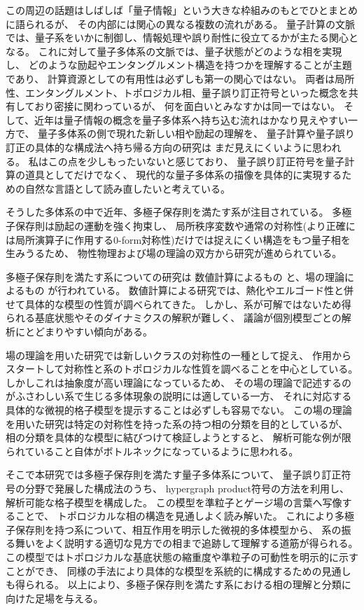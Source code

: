 \documentclass[../master.tex]{subfiles}
\begin{document}
この周辺の話題はしばしば「量子情報」という大きな枠組みのもとでひとまとめに語られるが、
その内部には関心の異なる複数の流れがある。
量子計算の文脈では、量子系をいかに制御し、情報処理や誤り耐性に役立てるかが主たる関心となる。
これに対して量子多体系の文脈では、量子状態がどのような相を実現し、
どのような励起やエンタングルメント構造を持つかを理解することが主題であり、
計算資源としての有用性は必ずしも第一の関心ではない。
両者は局所性、エンタングルメント、トポロジカル相、量子誤り訂正符号といった概念を共有しており密接に関わっているが、
何を面白いとみなすかは同一ではない。
そして、近年は量子情報の概念を量子多体系へ持ち込む流れはかなり見えやすい一方で、
量子多体系の側で現れた新しい相や励起の理解を、
量子計算や量子誤り訂正の具体的な構成法へ持ち帰る方向の研究は
まだ見えにくいように思われる。
私はこの点を少しもったいないと感じており、
量子誤り訂正符号を量子計算の道具としてだけでなく、
現代的な量子多体系の描像を具体的に実現するための自然な言語として読み直したいと考えている。

\bigskip
そうした多体系の中で近年、多極子保存則を満たす系が注目されている。
多極子保存則は励起の運動を強く拘束し、
局所秩序変数や通常の対称性(より正確には局所演算子に作用する0-form対称性)だけでは捉えにくい構造をもつ量子相を生みうるため、
物性物理および場の理論の双方から研究が進められている。

多極子保存則を満たす系についての研究は
数値計算によるもの
\cite{Sala2020-tm,Khemani2020-uw,Moudgalya2022-pg,Lake2022-nn}
と、場の理論によるもの
\cite{Pretko2017-jy, Gromov2019-mm,
    Zhai2021-nt, Grosvenor2021-zl, Ebisu2025-vv}
が行われている。
数値計算による研究では、熱化やエルゴード性と併せて具体的な模型の性質が調べられてきた。
しかし、系が可解ではないため得られる基底状態やそのダイナミクスの解釈が難しく、
議論が個別模型ごとの解析にとどまりやすい傾向がある。

場の理論を用いた研究では新しいクラスの対称性の一種として捉え、
作用からスタートして対称性と系のトポロジカルな性質を調べることを中心としている。
しかしこれは抽象度が高い理論になっているため、
その場の理論で記述するのがふさわしい系で生じる多体現象の説明には適している一方、
それに対応する具体的な微視的格子模型を提示することは必ずしも容易でない。
この場の理論を用いた研究は特定の対称性を持った系の持つ相の分類を目的としているが、
相の分類を具体的な模型に結びつけて検証しようとすると、
解析可能な例が限られていること自体がボトルネックになっているように思われる。

そこで本研究では多極子保存則を満たす量子多体系について、
量子誤り訂正符号の分野で発展した構成法のうち、
hypergraph product符号の方法を利用し、
解析可能な格子模型を構成した。
この模型を準粒子とゲージ場の言葉へ写像することで、
トポロジカルな相の構造を見通しよく読み解いた。
これにより多極子保存則を持つ系について、相互作用を明示した微視的多体模型から、
系の振る舞いをよく説明する適切な見方での相まで追跡して理解する道筋が得られる。
この模型ではトポロジカルな基底状態の縮重度や準粒子の可動性を明示的に示すことができ、
同様の手法により具体的な模型を系統的に構成するための見通しも得られる。
以上により、多極子保存則を満たす系における相の理解と分類に向けた足場を与える。
\end{document}
